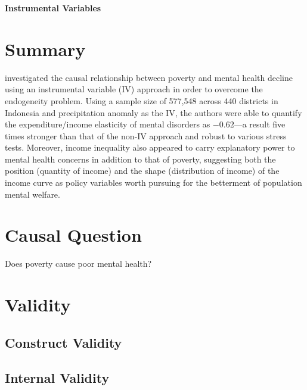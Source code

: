 \begin{center}
    \textbf{Instrumental Variables}
\end{center}

\begin{hangparas}{0.5in}{1}
\end{hangparas}

\bigskip

\section{Summary}

\textcite{hanandita:2014} investigated the causal relationship between poverty and mental health decline using an instrumental variable (IV) approach in order to overcome the endogeneity problem. Using a sample size of 577,548 across 440 districts in Indonesia and precipitation anomaly as the IV, the authors were able to quantify the expenditure/income elasticity of mental disorders as $-0.62$---a result five times stronger than that of the non-IV approach and robust to various stress tests. Moreover, income inequality also appeared to carry explanatory power to mental health concerns in addition to that of poverty, suggesting both the position (quantity of income) and the shape (distribution of income) of the income curve as policy variables worth pursuing for the betterment of population mental welfare.

\section{Causal Question}

Does poverty cause poor mental health?

\section{Validity}

\subsection{Construct Validity}

\subsection{Internal Validity}


